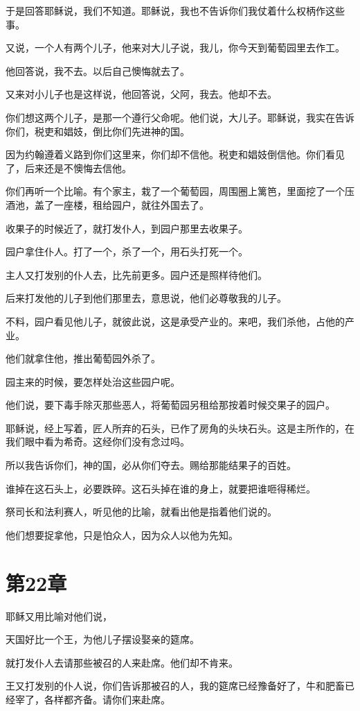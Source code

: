 \documentclass[12pt,oneside]{book}
\begin{document}
于是回答耶稣说，我们不知道。耶稣说，我也不告诉你们我仗着什么权柄作这些事。

又说，一个人有两个儿子，他来对大儿子说，我儿，你今天到葡萄园里去作工。

他回答说，我不去。以后自己懊悔就去了。

又来对小儿子也是这样说，他回答说，父阿，我去。他却不去。

你们想这两个儿子，是那一个遵行父命呢。他们说，大儿子。耶稣说，我实在告诉你们，税吏和娼妓，倒比你们先进神的国。

因为约翰遵着义路到你们这里来，你们却不信他。税吏和娼妓倒信他。你们看见了，后来还是不懊悔去信他。

你们再听一个比喻。有个家主，栽了一个葡萄园，周围圈上篱笆，里面挖了一个压酒池，盖了一座楼，租给园户，就往外国去了。

收果子的时候近了，就打发仆人，到园户那里去收果子。

园户拿住仆人。打了一个，杀了一个，用石头打死一个。

主人又打发别的仆人去，比先前更多。园户还是照样待他们。

后来打发他的儿子到他们那里去，意思说，他们必尊敬我的儿子。

不料，园户看见他儿子，就彼此说，这是承受产业的。来吧，我们杀他，占他的产业。

他们就拿住他，推出葡萄园外杀了。

园主来的时候，要怎样处治这些园户呢。

他们说，要下毒手除灭那些恶人，将葡萄园另租给那按着时候交果子的园户。

耶稣说，经上写着，匠人所弃的石头，已作了房角的头块石头。这是主所作的，在我们眼中看为希奇。这经你们没有念过吗。

所以我告诉你们，神的国，必从你们夺去。赐给那能结果子的百姓。

谁掉在这石头上，必要跌碎。这石头掉在谁的身上，就要把谁咂得稀烂。

祭司长和法利赛人，听见他的比喻，就看出他是指着他们说的。

他们想要捉拿他，只是怕众人，因为众人以他为先知。

\chapter{第22章}
耶稣又用比喻对他们说，

天国好比一个王，为他儿子摆设娶亲的筵席。

就打发仆人去请那些被召的人来赴席。他们却不肯来。

王又打发别的仆人说，你们告诉那被召的人，我的筵席已经豫备好了，牛和肥畜已经宰了，各样都齐备。请你们来赴席。
\end{document}

